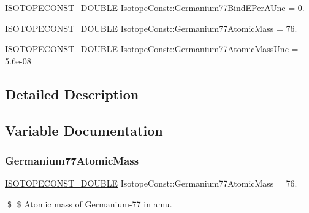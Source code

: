 \begin{DoxyCompactItemize}
\mbox{\hyperlink{group___isotope_const-_macros_ga8f45a7272ce02c0b4c65c44636ed719a}{I\+S\+O\+T\+O\+P\+E\+C\+O\+N\+S\+T\+\_\+\+D\+O\+U\+B\+LE}} \mbox{\hyperlink{group___isotope_const-_germanium-_ge77_ga9ac052ad8fc4f933f8d366e23c69aa25}{Isotope\+Const\+::\+Germanium77\+Bind\+E\+Per\+A\+Unc}} = 0.
\item 
\mbox{\hyperlink{group___isotope_const-_macros_ga8f45a7272ce02c0b4c65c44636ed719a}{I\+S\+O\+T\+O\+P\+E\+C\+O\+N\+S\+T\+\_\+\+D\+O\+U\+B\+LE}} \mbox{\hyperlink{group___isotope_const-_germanium-_ge77_gaf56173c8796f428affb0476ed0018c4e}{Isotope\+Const\+::\+Germanium77\+Atomic\+Mass}} = 76.
\item 
\mbox{\hyperlink{group___isotope_const-_macros_ga8f45a7272ce02c0b4c65c44636ed719a}{I\+S\+O\+T\+O\+P\+E\+C\+O\+N\+S\+T\+\_\+\+D\+O\+U\+B\+LE}} \mbox{\hyperlink{group___isotope_const-_germanium-_ge77_ga257673fc93178a0552c998941b1ab831}{Isotope\+Const\+::\+Germanium77\+Atomic\+Mass\+Unc}} = 5.\+6e-\/08
\end{DoxyCompactItemize}


\subsection{Detailed Description}


\subsection{Variable Documentation}
\mbox{\label{group___isotope_const-_germanium-_ge77_gaf56173c8796f428affb0476ed0018c4e}} 
\subsubsection{\texorpdfstring{Germanium77\+Atomic\+Mass}{Germanium77AtomicMass}}
{\footnotesize\ttfamily \mbox{\hyperlink{group___isotope_const-_macros_ga8f45a7272ce02c0b4c65c44636ed719a}{I\+S\+O\+T\+O\+P\+E\+C\+O\+N\+S\+T\+\_\+\+D\+O\+U\+B\+LE}} Isotope\+Const\+::\+Germanium77\+Atomic\+Mass = 76.}

\$ \$ Atomic mass of Germanium-\/77 in amu. \mbox{\label{group___isotope_const-_germanium-_ge77_ga257673fc93178a0552c998941b1ab831}} 
